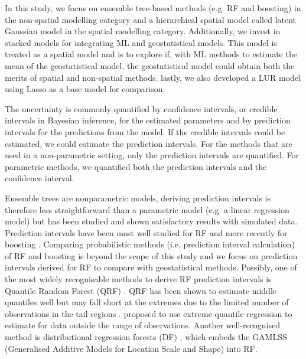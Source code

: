 \documentclass{article}
\begin{document}
In this study, we focus on ensemble tree-based methods (e.g. RF and boosting) in the non-spatial modelling category and a hierarchical spatial model \citep{lindgren2015bayesian, blangiardo2015spatial,moraga2019} called latent Gaussian model in the spatial modelling category. Additionally, we invest in stacked models for integrating ML and geostatistical models. This model is treated as a spatial model and is to explore if, with ML methods to estimate the mean of the geostatistical model, the geostatistical model could obtain both the merits of spatial and non-spatial methods. lastly, we also developed a LUR model using Lasso as a base model for comparison.  

The uncertainty is commonly quantified by confidence intervals, or credible intervals in Bayesian inference, for the estimated parameters and by prediction intervals for the predictions from the model. If the credible intervals could be estimated, we could estimate the prediction intervals. For the methods that are used in a non-parametric setting, only the prediction intervals are quantified. For parametric methods, we quantified both the prediction intervals and the confidence interval.  

Ensemble trees are nonparametric models, deriving prediction intervals is therefore less straightforward than a parametric model (e.g. a linear regression model) but has been studied and shown satisfactory results with simulated data. Prediction intervals have been most well studied for RF \citep{meinshausen2006quantile,wager2014confidence,stasinopoulos2007generalized,alakus2021rfpredinterval} and more recently for boosting \citep{duan2020ngboost,velthoen2021gradient}. Comparing probabilistic methods (i.e. prediction interval calculation) of RF and boosting is beyond the scope of this study and we focus on prediction intervals derived for RF to compare with geostatistical methods. Possibly, one of the most widely recognisable methods to derive RF prediction intervals is Quantile Random Forest (QRF) \citep{meinshausen2006quantile}. QRF has been shown to estimate middle quantiles well but may fall short at the extremes due to the limited number of observations in the tail regions \citep{velthoen2021gradient}. \cite{velthoen2021gradient} proposed to use extreme quantile regression to estimate for data outside the range of observations. Another well-recognised method is distributional regression forests (DF) \citep{schlosser2019distributional}, which embeds the GAMLSS (Generalised Additive Models for Location Scale and Shape) \citep{stasinopoulos2007generalized} into RF.  
\end{document}
